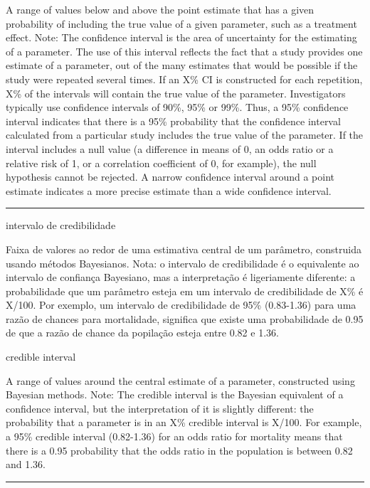 \documentclass[
  openany]{book}
\begin{document}
A range of values below and above the point estimate that has a given probability of including the true value of a given parameter, such as a treatment effect. Note: The confidence interval is the area of uncertainty for the estimating of a parameter. The use of this interval reflects the fact that a study provides one estimate of a parameter, out of the many estimates that would be possible if the study were repeated several times. If an X\% CI is constructed for each repetition, X\% of the intervals will contain the true value of the parameter. Investigators typically use confidence intervals of 90\%, 95\% or 99\%. Thus, a 95\% confidence interval indicates that there is a 95\% probability that the confidence interval calculated from a particular study includes the true value of the parameter. If the interval includes a null value (a difference in means of 0, an odds ratio or a relative risk of 1, or a correlation coefficient of 0, for example), the null hypothesis cannot be rejected. A narrow confidence interval around a point estimate indicates a more precise estimate than a wide confidence interval.

\begin{center}\rule{0.5\linewidth}{0.5pt}\end{center}

intervalo de credibilidade

Faixa de valores ao redor de uma estimativa central de um parâmetro, construida usando métodos Bayesianos. Nota: o intervalo de credibilidade é o equivalente ao intervalo de confiança Bayesiano, mas a interpretação é ligeriamente diferente: a probabilidade que um parâmetro esteja em um intervalo de credibilidade de X\% é X/100. Por exemplo, um intervalo de credibilidade de 95\% (0.83-1.36) para uma razão de chances para mortalidade, significa que existe uma probabilidade de 0.95 de que a razão de chance da popilação esteja entre 0.82 e 1.36.

credible interval

A range of values around the central estimate of a parameter, constructed using Bayesian methods. Note: The credible interval is the Bayesian equivalent of a confidence interval, but the interpretation of it is slightly different: the probability that a parameter is in an X\% credible interval is X/100. For example, a 95\% credible interval (0.82-1.36) for an odds ratio for mortality means that there is a 0.95 probability that the odds ratio in the population is between 0.82 and 1.36.

\begin{center}\rule{0.5\linewidth}{0.5pt}\end{center}
\end{document}
